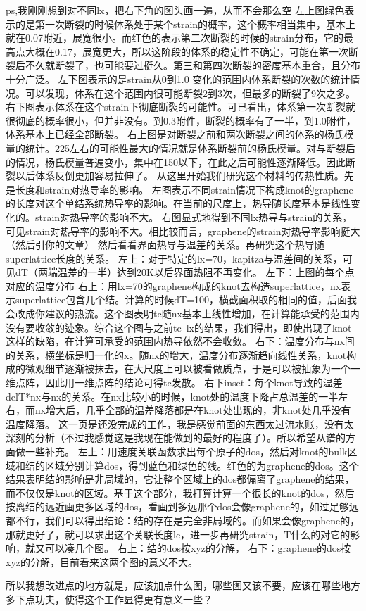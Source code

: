ps,我刚刚想到对不同lx，把右下角的图头画一遍，从而不会那么空
左上图绿色表示的是第一次断裂的时候体系处于某个strain的概率，这个概率相当集中，基本上就在0.07附近，展宽很小。而红色的表示第二次断裂的时候的strain分布，它的最高点大概在0.17，展宽更大，所以这阶段的体系的稳定性不确定，可能在第一次断裂后不久就断裂了，也可能要过挺久。第三和第四次断裂的密度基本重合，且分布十分广泛。
左下图表示的是strain从0到1.0 变化的范围内体系断裂的次数的统计情况。可以发现，体系在这个范围内很可能断裂2到3次，但最多的断裂了9次之多。
右下图表示体系在这个strain下彻底断裂的可能性。可已看出，体系第一次断裂就很彻底的概率很小，但并非没有。到0.3附件，断裂的概率有了一半，到1.0附件，体系基本上已经全部断裂。
右上图是对断裂之前和两次断裂之间的体系的杨氏模量的统计。225左右的可能性最大的情况就是体系断裂前的杨氏模量。对与断裂后的情况，杨氏模量普遍变小，集中在150以下，在此之后可能性逐渐降低。因此断裂以后体系反倒更加容易拉伸了。
从这里开始我们研究这个材料的传热性质。先是长度和strain对热导率的影响。
左图表示不同strain情况下构成knot的graphene的长度对这个单结系统热导率的影响。在当前的尺度上，热导随长度基本是线性变化的。strain对热导率的影响不大。
右图显式地得到不同lx热导与strain的关系，可见strain对热导率的影响不大。相比较而言，graphene的strain对热导率影响挺大（然后引你的文章）
然后看看界面热导与温差的关系。再研究这个热导随superlattice长度的关系。
左上：对于特定的lx=70，kapitza与温差间的关系，可见dT（两端温差的一半）达到20K以后界面热阻不再变化。
左下：上图的每个点对应的温度分布
右上：用lx=70的graphene构成的knot去构造superlattice，nx表示superlattice包含几个结。计算的时候dT=100，横截面积取的相同的值，后面我会改成你建议的热流。这个图表明tc随nx基本上线性增加，在计算能承受的范围内没有要收敛的迹象。综合这个图与之前tc~lx的结果，我们得出，即使出现了knot这样的缺陷，在计算可承受的范围内热导依然不会收敛。
右下：温度分布与nx间的关系，横坐标是归一化的x。随nx的增大，温度分布逐渐趋向线性关系，knot构成的微观细节逐渐被抹去，在大尺度上可以被看做质点，于是可以被抽象为一个一维点阵，因此用一维点阵的结论可得tc发散。
右下inset：每个knot导致的温差delT*nx与nx的关系。在nx比较小的时候，knot处的温度下降占总温差的一半左右，而nx增大后，几乎全部的温差降落都是在knot处出现的，非knot处几乎没有温度降落。
这一页是还没完成的工作，我是感觉前面的东西太过流水账，没有太深刻的分析（不过我感觉这是我现在能做到的最好的程度了）。所以希望从谱的方面做一些补充。
左上：用速度关联函数求出每个原子的dos，然后对knot的bulk区域和结的区域分别计算dos，得到蓝色和绿色的线。红色的为graphene的dos。这个结果表明结的影响是非局域的，它让整个区域上的dos都偏离了graphene的结果，而不仅仅是knot的区域。基于这个部分，我打算计算一个很长的knot的dos，然后按离结的远近画更多区域的dos，看画到多远那个dos会像graphene的，如过足够远都不行，我们可以得出结论：结的存在是完全非局域的。而如果会像graphene的，那就更好了，就可以求出这个关联长度lc，进一步再研究strain，T什么的对它的影响，就又可以凑几个图。
右上：结的dos按xyz的分解，
右下：graphene的dos按xyz的分解，目前看来这两个图的意义不大。

所以我想改进点的地方就是，应该加点什么图，哪些图又该不要，应该在哪些地方多下点功夫，使得这个工作显得更有意义一些？



